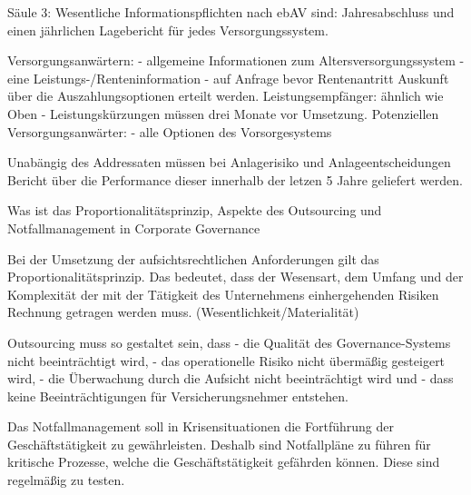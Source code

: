 Säule 3:
Wesentliche Informationspflichten nach ebAV sind:
Jahresabschluss und einen jährlichen Lagebericht für jedes Versorgungssystem. 

Versorgungsanwärtern: 
- allgemeine Informationen zum Altersversorgungssystem 
- eine Leistungs-/Renteninformation 
- auf Anfrage bevor Rentenantritt Auskunft über die Auszahlungsoptionen erteilt werden.
Leistungsempfänger:
ähnlich wie Oben
- Leistungskürzungen müssen drei Monate vor Umsetzung.
Potenziellen Versorgungsanwärter:
- alle Optionen des Vorsorgesystems

Unabängig des Addressaten müssen bei Anlagerisiko und Anlageentscheidungen
Bericht über die Performance dieser innerhalb der letzen 5 Jahre geliefert werden.



Was ist das Proportionalitätsprinzip, Aspekte des Outsourcing und Notfallmanagement in Corporate Governance

Bei der Umsetzung der aufsichtsrechtlichen Anforderungen gilt das Proportionalitätsprinzip. 
Das bedeutet, dass der Wesensart, dem Umfang und der Komplexität der mit der Tätigkeit des Unternehmens 
einhergehenden Risiken Rechnung getragen werden muss. (Wesentlichkeit/Materialität)


Outsourcing muss so gestaltet sein, dass
- die Qualität des Governance-Systems nicht beeinträchtigt wird,
- das operationelle Risiko nicht übermäßig gesteigert wird,
- die Überwachung durch die Aufsicht nicht beeinträchtigt wird und
- dass keine Beeinträchtigungen für Versicherungsnehmer entstehen.

Das Notfallmanagement soll in Krisensituationen die Fortführung der Geschäftstätigkeit zu gewährleisten. 
Deshalb sind Notfallpläne zu führen für kritische Prozesse, welche die Geschäftstätigkeit gefährden können.
Diese sind regelmäßig zu testen.
